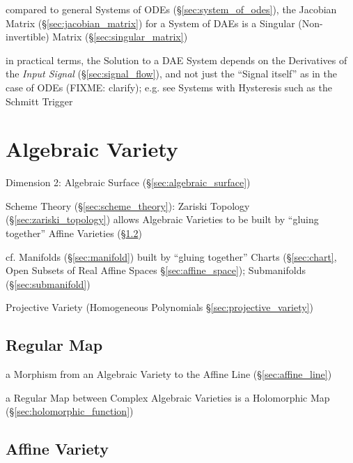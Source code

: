 compared to general Systems of ODEs (\S\ref{sec:system_of_odes}), the Jacobian
Matrix (\S\ref{sec:jacobian_matrix}) for a System of DAEs is a Singular
(Non-invertible) Matrix (\S\ref{sec:singular_matrix})

in practical terms, the Solution to a DAE System depends on the Derivatives of
the \emph{Input Signal} (\S\ref{sec:signal_flow}), and not just the ``Signal
itself'' as in the case of ODEs
(FIXME: clarify); e.g. see Systems with Hysteresis such as the Schmitt Trigger



\section{Algebraic Variety}\label{sec:algebraic_variety}

Dimension 2: Algebraic Surface (\S\ref{sec:algebraic_surface})

Scheme Theory (\S\ref{sec:scheme_theory}): Zariski Topology
(\S\ref{sec:zariski_topology}) allows Algebraic Varieties to be built by
``gluing together'' Affine Varieties (\S\ref{sec:affine_variety})

cf. Manifolds (\S\ref{sec:manifold}) built by ``gluing together'' Charts
(\S\ref{sec:chart}, Open Subsets of Real Affine Spaces
\S\ref{sec:affine_space}); Submanifolds (\S\ref{sec:submanifold})

\fist Projective Variety (Homogeneous Polynomials \S\ref{sec:projective_variety})



\subsection{Regular Map}\label{sec:regular_map}

a Morphism from an Algebraic Variety to the Affine Line
(\S\ref{sec:affine_line})

a Regular Map between Complex Algebraic Varieties is a Holomorphic Map
(\S\ref{sec:holomorphic_function})



\subsection{Affine Variety}\label{sec:affine_variety}

